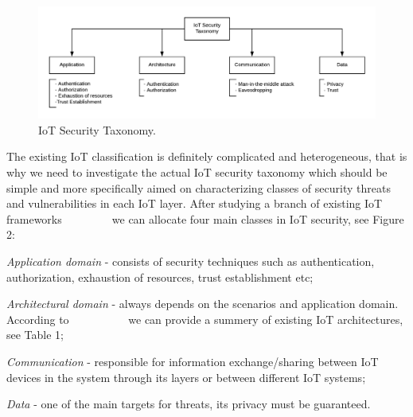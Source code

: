 \documentclass[12pt]{article}
\begin{document}
\begin{figure} [H] %
	\begin{center}
		\includegraphics[width=1\textwidth]{IoT_Sec_Tax}
		\caption{IoT Security Taxonomy.}
		\label{fig:ref_model}
	\end{center}
\end{figure}

The existing IoT classification is definitely complicated and heterogeneous, that is why we need to investigate the actual IoT security taxonomy which should be simple and more specifically aimed on characterizing classes of security threats and vulnerabilities in each IoT layer. After studying a branch of existing IoT frameworks ~\cite{SDN/NFV} ~\cite{SEA} ~\cite{SmartC} ~\cite{SOA} ~\cite{Concept} we can allocate four main classes in IoT security, see Figure 2: 
\begin{enumerate*}[label=(\roman*)]
	\item \textit{Application domain} - consists of security techniques such as authentication, authorization, exhaustion  of resources, trust establishment etc;
	\item \textit{Architectural domain} - always depends on the scenarios and application domain. According to ~\cite{IoTSur} ~\cite{SDN/NFV} ~\cite{SEA} ~\cite{SmartC} ~\cite{SOA} ~\cite{Concept} we can provide a summery of existing IoT architectures, see Table 1;
	\item \textit{Communication} - responsible for information exchange/sharing between IoT devices in the system through its layers or between different IoT systems;
	\item \textit{Data} - one of the main targets for threats, its privacy must be guaranteed.
\end{enumerate*}
\end{document}
